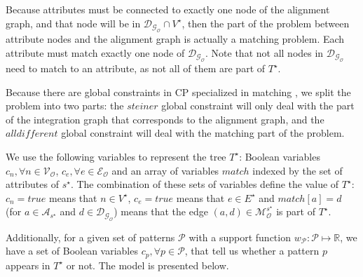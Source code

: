 \documentclass[letterpaper]{article} %
\begin{document}
Because attributes must be connected to exactly one node of the alignment 
graph, and that node will be in $\mathcal{D_{G_O}} \cap V^\star$, 
then the part of the problem between attribute nodes and the alignment graph is 
actually a matching problem. Each attribute must match exactly one node of 
$\mathcal{D_{G_O}}$. Note that not all nodes in $\mathcal{D_{G_O}}$ need to match 
to an attribute, as not all of them are part of $T^\star$.

Because there are global constraints in CP specialized in matching 
\cite{regin1994filtering}, we split the problem into two parts: the 
$\mathit{steiner}$ global constraint \cite{deuna2016steiner} will only deal with the part of the 
integration graph that corresponds to the alignment graph, and the 
$\mathit{alldifferent}$ global constraint will deal with the matching part of 
the problem.

We use the following variables to represent the tree $T^\star$: Boolean 
variables $c_n,\forall n \in 
\mathcal{V_O}$, $c_e, \forall e \in	\mathcal{E_O}$ and an array of variables 
$match$ indexed by the set of attributes of $s^\star$. The combination of these 
sets of variables define the value of $T^\star$: $c_n = \mathit{true}$ means 
that $n \in V^\star$, $c_e = \mathit{true}$ means that $e \in E^\star$ and 
$match[a] = d$ (for $a \in \mathcal{A}_{s^\star}$ and $d \in 
\mathcal{D_{G_O}}$) means that the edge $(a,d) \in 
\mathcal{M}_\mathcal{O}^{s^\star}$ is part of $T^\star$.

Additionally, for a given set of patterns $\mathcal{P}$ with a support function 
$w_\mathcal{P} : \mathcal{P} \mapsto \mathbb{R}$, we have a set of Boolean 
variables 
$c_p, \forall p \in \mathcal{P}$, that tell us whether a pattern $p$ appears in 
$T^\star$ or not.
The model is presented below.
\end{document}
